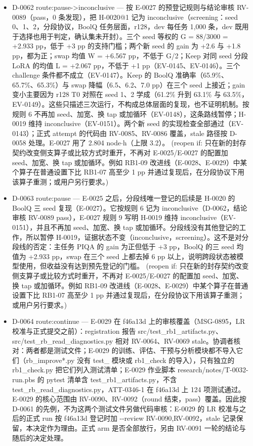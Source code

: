 \documentclass[11pt]{article}
\begin{document}
\begin{itemize}
\item D-0062 route:pause-\textgreater{}inconclusive --- 按 E-0027 的预登记规则与结论审核 RV-0089（pass，0 条发现），把 H-0020@1 记为 inconclusive（screening：seed 0、1、2，分段协议，BoolQ 任务层面，r128，dev 每任务 1,000 条，dev 既用于选择也用于判定，确认集未开封）。三个 seed 等权的 G = 88/3000 = +2.933 pp，低于 +3 pp 的支持门槛；两个新 seed 的 gain 为 +2.6 与 +1.8 pp，都为正；swap 均值 W = +6.567 pp，不低于 G/2；Keep 对同 seed 分段 LoRA 的均值 L = +2.067 pp，不低于 +1 pp（EV-0145、EV-0146）。三个 challenge 条件都不成立（EV-0147）。Keep 的 BoolQ 准确率（65.9\%、65.7\%、65.3\%）与 swap 降幅（6.5、6.2、7.0 pp）在三个 seed 上接近；gain 变小主要因为 r128 T0 对照在 seed 1、2 学成（61.2\% 升到 63.1\% 与 63.5\%，EV-0149）。这些只描述三次运行，不构成总体层面的复现，也不证明机制。按规则 6 不再加 seed、加宽、换 tap 或加循环（EV-0148），这条路线暂停；H-0019 维持 inconclusive（EV-0151）。两个新 seed 的实现检查全部通过（EV-0143）；正式 attempt 的代码由 RV-0085、RV-0086 覆盖，stale 路径按 D-0058 处理。E-0027 用了 2.804 node\ensuremath{\cdot}h（上限 3.2）。 (reopen if: 只在新的封存契约改变侧支算子或比较方式时重开，不再对 E-0025/E-0027 的配置加 seed、加宽、换 tap 或加循环。例如 RB1-09 改进线（E-0028、E-0029）中某个算子在普通设置下比 RB1-07 高至少 1 pp 并通过复现后，在分段协议下用该算子重测；或用户另行要求。)
\item D-0063 route:pause --- E-0025 之后，分段线唯一登记的后续是 H-0020 的 BoolQ 三 seed 复现（E-0027）。它按规则 6 记为 inconclusive（D-0062，结论审核 RV-0089 pass），E-0027 规则 9 写明 H-0019 维持 inconclusive（EV-0151），并且不再加 seed、加宽、换 tap 或加循环。分段线没有其他登记的工作，所以暂停 H-0019，证据状态不变（inconclusive，screening）。这不是对分段线的否定：主任务 PIQA 的 gain 为正但低于 +3 pp，BoolQ 的三 seed 均值为 +2.933 pp，swap 在三个 seed 上都去掉 6 pp 以上，说明跨段状态被模型使用，但收益没有达到预先登记的门槛。 (reopen if: 只在新的封存契约改变侧支算子或比较方式时重开，不再对 E-0025/E-0027 的配置加 seed、加宽、换 tap 或加循环。例如 RB1-09 改进线（E-0028、E-0029）中某个算子在普通设置下比 RB1-07 高至少 1 pp 并通过复现后，在分段协议下用该算子重测；或用户另行要求。)
\item D-0064 route:continue --- E-0029 在 f46a13d 上的审核覆盖（MSG-0895，LR 校准与正式提交之前）：registration 报告 src/test\_rb1\_artifacts.py、src/test\_rb\_read\_diagnostics.py 相对 RV-0064、RV-0069 stale。协调者核对：两者都是测试文件；E-0029 的训练、评估、干预与分析模块都不导入它们（rb\_improve*.py 没有 test\_ 模块或 rb1\_check 的导入），只有独立的 rb1\_check.py 把它们列入测试清单；E-0029 作业脚本 research/notes/T-0032-run.pbs 的 pytest 清单含 test\_rb1\_artifacts.py，不含 test\_rb\_read\_diagnostics.py，ATT-0346-1 在 f46a13d 上 124 项测试通过。E-0029 的核心范围由 RV-0090、RV-0092（round 结束，pass）覆盖。因此按 D-0061 的先例，不为这两个测试文件另做代码审核：E-0029 的 LR 校准与之后的正式 run 按 f46a13d 登记时加 -{}-review RV-0090,RV-0092，stale 记录保留，本决定作为理由。正式 arm 是否全部放行，另由 RV-0091 一轮的结论与随后的决定处理。

\end{itemize}
\end{document}

